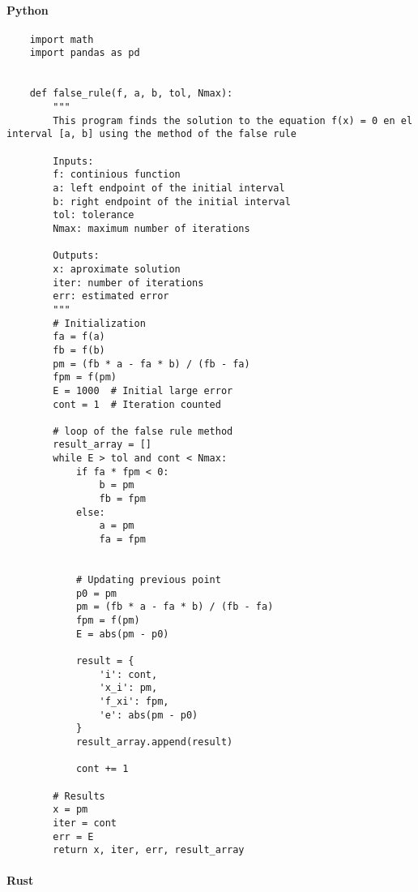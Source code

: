 \documentclass{article}
\begin{document}
        \paragraph{Python}
        \begin{verbatim}
    import math
    import pandas as pd


    def false_rule(f, a, b, tol, Nmax):
        """
        This program finds the solution to the equation f(x) = 0 en el interval [a, b] using the method of the false rule

        Inputs:
        f: continious function
        a: left endpoint of the initial interval
        b: right endpoint of the initial interval
        tol: tolerance
        Nmax: maximum number of iterations

        Outputs:
        x: aproximate solution
        iter: number of iterations
        err: estimated error
        """
        # Initialization
        fa = f(a)
        fb = f(b)
        pm = (fb * a - fa * b) / (fb - fa)
        fpm = f(pm)
        E = 1000  # Initial large error
        cont = 1  # Iteration counted

        # loop of the false rule method
        result_array = []
        while E > tol and cont < Nmax:
            if fa * fpm < 0:
                b = pm
                fb = fpm
            else:
                a = pm
                fa = fpm


            # Updating previous point
            p0 = pm
            pm = (fb * a - fa * b) / (fb - fa)
            fpm = f(pm)
            E = abs(pm - p0)

            result = {
                'i': cont,
                'x_i': pm,
                'f_xi': fpm,
                'e': abs(pm - p0)
            }
            result_array.append(result)

            cont += 1

        # Results
        x = pm
        iter = cont
        err = E
        return x, iter, err, result_array
        \end{verbatim}

    \paragraph{Rust}
\end{document}

